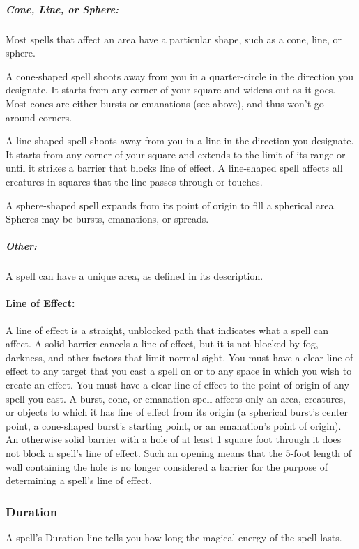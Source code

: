 \subparagraph{Cone, Line, or Sphere:} Most spells that affect an area have a particular shape, such as a cone, line, or sphere. 

A cone-shaped spell shoots away from you in a quarter-circle in the direction you designate. 
It starts from any corner of your square and widens out as it goes. 
Most cones are either bursts or emanations (see above), and thus won't go around corners.

A line-shaped spell shoots away from you in a line in the direction you designate. 
It starts from any corner of your square and extends to the limit of its range or until it strikes a barrier that blocks line of effect. 
A line-shaped spell affects all creatures in squares that the line passes through or touches.

A sphere-shaped spell expands from its point of origin to fill a spherical area. Spheres may be bursts, emanations, or spreads.

\subparagraph{Other:} A spell can have a unique area, as defined in its description.

\paragraph{Line of Effect:} A line of effect is a straight, unblocked path that indicates what a spell can affect. 
A solid barrier cancels a line of effect, but it is not blocked by fog, darkness, and other factors that limit normal sight. 
You must have a clear line of effect to any target that you cast a spell on or to any space in which you wish to create an effect. 
You must have a clear line of effect to the point of origin of any spell you cast.
A burst, cone, or emanation spell affects only an area, creatures, or objects to which it has line of effect from its origin 
(a spherical burst's center point, a cone-shaped burst's starting point, or an emanation's point of origin). 
An otherwise solid barrier with a hole of at least 1 square foot through it does not block a spell's line of effect. 
Such an opening means that the 5-foot length of wall containing the hole is no longer considered a barrier for the purpose of determining a spell's line of effect.

\subsubsection{Duration}
A spell's Duration line tells you how long the magical energy of the spell lasts.

